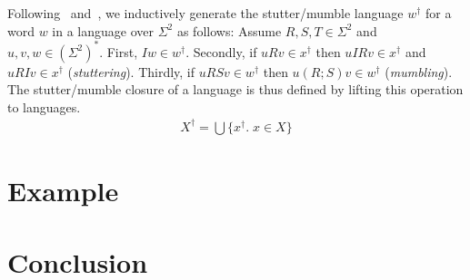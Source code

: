 \documentclass{llncs}
\begin{document}
\newpage

Following~\cite{brookes_full_1993} and~\cite{dingel_refinement_2002},
we inductively generate the stutter/mumble language $w^\dagger$ for a
word $w$ in a language over $\Sigma^2$ as follows: Assume $R,S,T \in
\Sigma^2$ and $u,v,w \in (\Sigma^2)^*$. First, $Iw \in
w^\dagger$. Secondly, if $uRv \in x^\dagger$ then $uIRv \in
x^\dagger$ and $uRIv \in x^\dagger$ (\emph{stuttering}). Thirdly, if
$uRSv \in w^\dagger$ then $u(R;S)v \in w^\dagger$
(\emph{mumbling}). The stutter/mumble closure of a language is
thus defined by lifting this operation to languages.
\begin{align*}
X^\dagger = \bigcup\{x^\dagger.\; x \in X\}
\end{align*}

\newpage
\section{Example}

\newpage
\section{Conclusion}

{}

\end{document}
